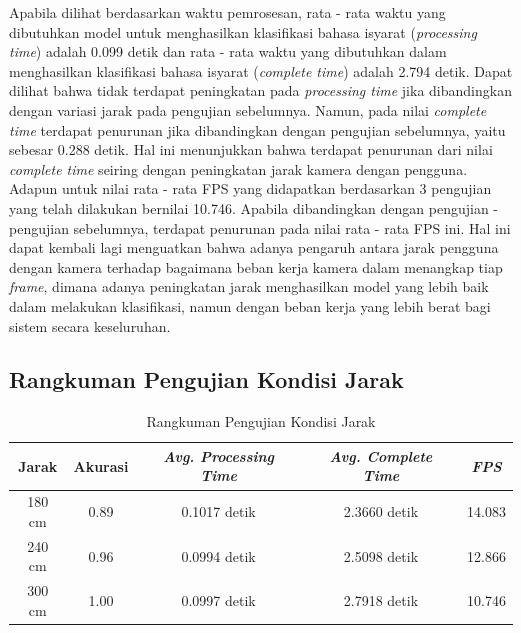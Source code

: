 Apabila dilihat berdasarkan waktu pemrosesan, rata - rata waktu yang dibutuhkan model untuk menghasilkan klasifikasi bahasa isyarat (\emph{processing time}) adalah 0.099 detik dan rata - rata waktu yang dibutuhkan dalam menghasilkan klasifikasi bahasa isyarat (\emph{complete time}) adalah 2.794 detik. Dapat dilihat bahwa tidak terdapat peningkatan pada \emph{processing time} jika dibandingkan dengan variasi jarak pada pengujian sebelumnya. Namun, pada nilai \emph{complete time} terdapat penurunan jika dibandingkan dengan pengujian sebelumnya, yaitu sebesar 0.288 detik. Hal ini menunjukkan bahwa terdapat penurunan dari nilai \emph{complete time} seiring dengan peningkatan jarak kamera dengan pengguna. Adapun untuk nilai rata - rata FPS yang didapatkan berdasarkan 3 pengujian yang telah dilakukan bernilai 10.746. Apabila dibandingkan dengan pengujian - pengujian sebelumnya, terdapat penurunan pada nilai rata - rata FPS ini. Hal ini dapat kembali lagi menguatkan bahwa adanya pengaruh antara jarak pengguna dengan kamera terhadap bagaimana beban kerja kamera dalam menangkap tiap \emph{frame}, dimana adanya peningkatan jarak menghasilkan model yang lebih baik dalam melakukan klasifikasi, namun dengan beban kerja yang lebih berat bagi sistem secara keseluruhan.

\subsection{Rangkuman Pengujian Kondisi Jarak}
\label{sec:analisisrangkumanjarak}

\begin{longtable}{|c|c|c|c|c|}
  \caption{Rangkuman Pengujian Kondisi Jarak}
  \label{tb:evaluasiJarak}                                   \\
  \hline
  \rowcolor[HTML]{C0C0C0}
  \textbf{Jarak} & \textbf{Akurasi} & \emph{\textbf{Avg. Processing Time}} & \emph{\textbf{Avg. Complete Time}} & \emph{FPS}\\
  \hline
  180 cm & 0.89 & 0.1017 detik & 2.3660 detik & 14.083\\
  240 cm & 0.96 & 0.0994 detik & 2.5098 detik & 12.866\\
  300 cm & 1.00 & 0.0997 detik & 2.7918 detik & 10.746\\
  \hline
\end{longtable}

